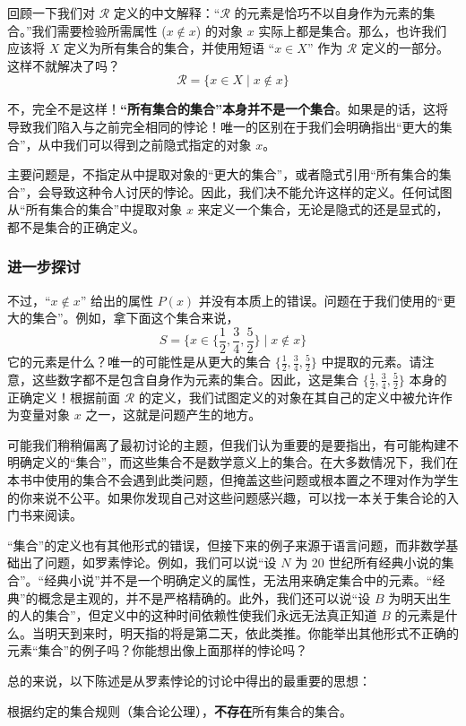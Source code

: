 回顾一下我们对 $\mathcal{R}$ 定义的中文解释：``$\mathcal{R}$ 的元素是恰巧不以自身作为元素的集合。''我们需要检验所需属性 ($x \notin x$) 的对象 $x$ 实际上都是集合。那么，也许我们应该将 $X$ 定义为所有集合的集合，并使用短语 ``$x \in X$'' 作为 $\mathcal{R}$ 定义的一部分。这样不就解决了吗？
\[\mathcal{R} = \{x \in X \mid x \notin x\}\]

不，完全不是这样！\textbf{``所有集合的集合''本身并不是一个集合}。如果是的话，这将导致我们陷入与之前完全相同的悖论！唯一的区别在于我们会明确指出``更大的集合''，从中我们可以得到之前隐式指定的对象 $x$。

主要问题是，不指定从中提取对象的``更大的集合''，或者隐式引用``所有集合的集合''，会导致这种令人讨厌的悖论。因此，我们决不能允许这样的定义。任何试图从``所有集合的集合''中提取对象 $x$ 来定义一个集合，无论是隐式的还是显式的，都不是集合的正确定义。

\subsubsection*{进一步探讨}

不过，``$x \notin x$'' 给出的属性 $P(x)$ 并没有本质上的错误。问题在于我们使用的``更大的集合''。例如，拿下面这个集合来说，
\[S = \Bigg\{x \in \bigg\{\frac{1}{2}, \frac{3}{4}, \frac{5}{2}\bigg\} \mid x \notin x \Bigg\}\]
它的元素是什么？唯一的可能性是从更大的集合 $\{\frac{1}{2}, \frac{3}{4}, \frac{5}{2}\}$ 中提取的元素。请注意，这些数字都不是包含自身作为元素的集合。因此，这是集合 $\{\frac{1}{2}, \frac{3}{4}, \frac{5}{2}\}$ 本身的正确定义！根据前面 $\mathcal{R}$ 的定义，我们试图定义的对象在其自己的定义中被允许作为变量对象 $x$ 之一，这就是问题产生的地方。

可能我们稍稍偏离了最初讨论的主题，但我们认为重要的是要指出，有可能构建不明确定义的``集合''，而这些集合不是数学意义上的集合。在大多数情况下，我们在本书中使用的集合不会遇到此类问题，但掩盖这些问题或根本置之不理对作为学生的你来说不公平。如果你发现自己对这些问题感兴趣，可以找一本关于集合论的入门书来阅读。

``集合''的定义也有其他形式的错误，但接下来的例子来源于语言问题，而非数学基础出了问题，如罗素悖论。例如，我们可以说``设 $N$ 为 20 世纪所有经典小说的集合''。``经典小说''并不是一个明确定义的属性，无法用来确定集合中的元素。``经典''的概念是主观的，并不是严格精确的。此外，我们还可以说``设 $B$ 为明天出生的人的集合''，但定义中的这种时间依赖性使我们永远无法真正知道 $B$ 的元素是什么。当明天到来时，明天指的将是第二天，依此类推。你能举出其他形式不正确的元素``集合''的例子吗？你能想出像上面那样的悖论吗？

总的来说，以下陈述是从罗素悖论的讨论中得出的最重要的思想：

\begin{center}根据约定的集合规则（集合论公理），\textbf{不存在}所有集合的集合。\end{center}
